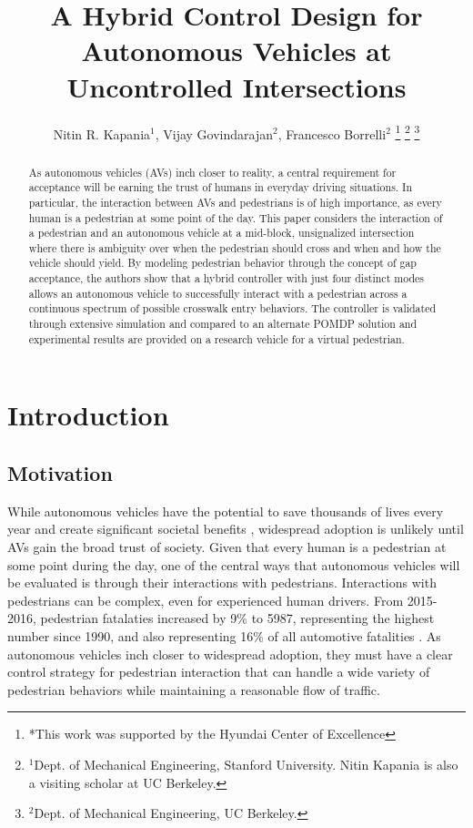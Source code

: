 \documentclass[letterpaper, 10 pt, conference]{ieeeconf} %
\title{\LARGE \bf
A Hybrid Control Design for Autonomous Vehicles at Uncontrolled Intersections}
\author{Nitin R. Kapania$^{1}$, Vijay Govindarajan$^{2}$, Francesco Borrelli$^{2}$%
\thanks{*This work was supported by the Hyundai Center of Excellence}%
\thanks{$^{1}$Dept. of Mechanical Engineering, Stanford University. Nitin Kapania is also a visiting scholar at UC Berkeley.}%
\thanks{$^{2}$Dept. of Mechanical Engineering, UC Berkeley.}%
}
\begin{document}
\maketitle
\thispagestyle{empty}
\pagestyle{empty}


\begin{abstract}

As autonomous vehicles (AVs) inch closer to reality, a central requirement for acceptance will be earning the trust of humans in everyday driving situations. In particular, the interaction between AVs and pedestrians is of
high importance, as every human is a pedestrian at some point of the day. This paper considers the interaction of a pedestrian and an autonomous vehicle at a mid-block, unsignalized intersection where there is ambiguity
over when the pedestrian should cross and when and how the vehicle should yield. By modeling pedestrian behavior through the concept of gap acceptance, the authors show that a hybrid controller with just four distinct modes allows an autonomous vehicle to successfully interact with a pedestrian across a continuous spectrum of possible crosswalk entry behaviors. The controller is validated through extensive simulation and compared to an alternate POMDP solution and experimental results are provided on a research vehicle for a virtual pedestrian. 

\end{abstract}


\section{Introduction}

\subsection{Motivation}

While autonomous vehicles have the potential to save thousands of lives every year and create significant societal benefits \cite{Fagnant2015}, widespread adoption is unlikely until AVs gain the broad trust of society. Given that every human is a pedestrian at some point during the day, one of the central ways that autonomous vehicles will be evaluated is through their interactions with pedestrians. Interactions with pedestrians can be complex, even for experienced human drivers. From 2015-2016, pedestrian fatalaties increased by 9\% to 5987, representing the highest number since 1990, and also representing 16\% of all automotive fatalities \cite{HighwayTrafficSafetyAdministration2016}. As autonomous vehicles inch closer to widespread adoption, they must have a clear control strategy for pedestrian interaction that can handle a wide variety of pedestrian behaviors while maintaining a reasonable flow of traffic.  
\end{document}
